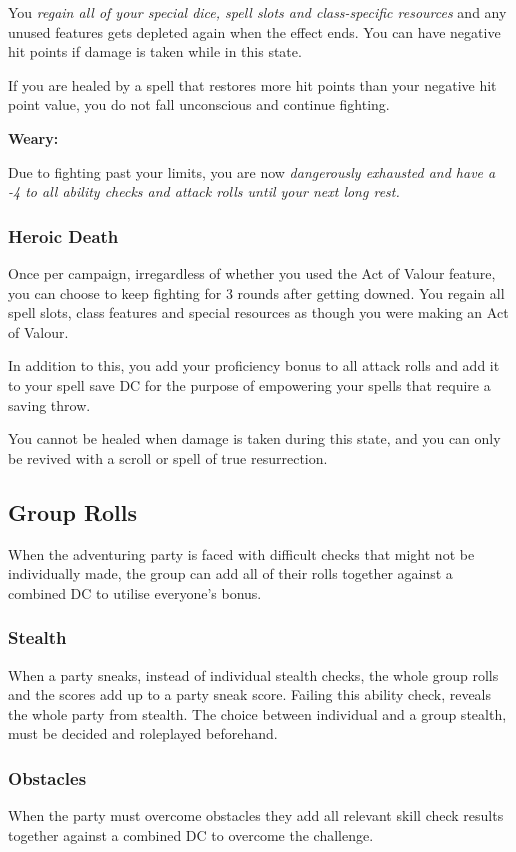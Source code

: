 \documentclass{apotheosis-book}
\begin{document}
You \textit{regain all of your special dice, spell slots and class-specific resources} and any unused features gets depleted again when the effect ends. You can have negative hit points if damage is taken while in this state.

If you are healed by a spell that restores more hit points than your negative hit point value, you do not fall unconscious and continue fighting.

\textbf{Weary:}

Due to fighting past your limits, you are now \textit{dangerously exhausted and have a -4 to all ability checks and attack rolls until your next long rest.}

\subsubsection{Heroic Death}
Once per campaign, irregardless of whether you used the Act of Valour feature, you can choose to keep fighting for 3 rounds after getting downed. You regain all spell slots, class features and special resources as though you were making an Act of Valour.

In addition to this, you add your proficiency bonus to all attack rolls and add it to your spell save DC for the purpose of empowering your spells that require a saving throw. 

You cannot be healed when damage is taken during this state, and you can only be revived with a scroll or spell of true resurrection. 


\subsection{Group Rolls}
When the adventuring party is faced with difficult checks that might not be individually made, the group can add all of their rolls together against a combined DC to utilise everyone's bonus.

\subsubsection{Stealth}
When a party sneaks, instead of individual stealth checks, the whole group rolls and the scores add up to a party sneak score. Failing this ability check, reveals the whole party from stealth. The choice between individual and a group stealth, must be decided and roleplayed beforehand.

\subsubsection{Obstacles}
When the party must overcome obstacles they add all relevant skill check results together against a combined DC to overcome the challenge.
\end{document}

